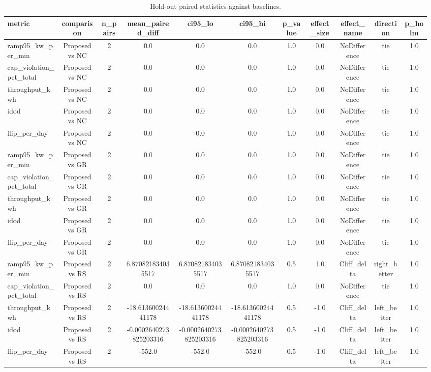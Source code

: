 \begin{table}[t]
\centering
\caption{Hold-out paired statistics against baselines.}
\label{tab:holdout_stats_auto}
\begin{tabular}{lcccccccccc}
\toprule
metric & comparison & n\_pairs & mean\_paired\_diff & ci95\_lo & ci95\_hi & p\_value & effect\_size & effect\_name & direction & p\_holm \\
\midrule
ramp95\_kw\_per\_min & Proposed vs NC & 2 & 0.0 & 0.0 & 0.0 & 1.0 & 0.0 & NoDifference & tie & 1.0 \\
cap\_violation\_pct\_total & Proposed vs NC & 2 & 0.0 & 0.0 & 0.0 & 1.0 & 0.0 & NoDifference & tie & 1.0 \\
throughput\_kwh & Proposed vs NC & 2 & 0.0 & 0.0 & 0.0 & 1.0 & 0.0 & NoDifference & tie & 1.0 \\
idod & Proposed vs NC & 2 & 0.0 & 0.0 & 0.0 & 1.0 & 0.0 & NoDifference & tie & 1.0 \\
flip\_per\_day & Proposed vs NC & 2 & 0.0 & 0.0 & 0.0 & 1.0 & 0.0 & NoDifference & tie & 1.0 \\
ramp95\_kw\_per\_min & Proposed vs GR & 2 & 0.0 & 0.0 & 0.0 & 1.0 & 0.0 & NoDifference & tie & 1.0 \\
cap\_violation\_pct\_total & Proposed vs GR & 2 & 0.0 & 0.0 & 0.0 & 1.0 & 0.0 & NoDifference & tie & 1.0 \\
throughput\_kwh & Proposed vs GR & 2 & 0.0 & 0.0 & 0.0 & 1.0 & 0.0 & NoDifference & tie & 1.0 \\
idod & Proposed vs GR & 2 & 0.0 & 0.0 & 0.0 & 1.0 & 0.0 & NoDifference & tie & 1.0 \\
flip\_per\_day & Proposed vs GR & 2 & 0.0 & 0.0 & 0.0 & 1.0 & 0.0 & NoDifference & tie & 1.0 \\
ramp95\_kw\_per\_min & Proposed vs RS & 2 & 6.870821834035517 & 6.870821834035517 & 6.870821834035517 & 0.5 & 1.0 & Cliff\_delta & right\_better & 1.0 \\
cap\_violation\_pct\_total & Proposed vs RS & 2 & 0.0 & 0.0 & 0.0 & 1.0 & 0.0 & NoDifference & tie & 1.0 \\
throughput\_kwh & Proposed vs RS & 2 & -18.61360024441178 & -18.61360024441178 & -18.61360024441178 & 0.5 & -1.0 & Cliff\_delta & left\_better & 1.0 \\
idod & Proposed vs RS & 2 & -0.0002640273825203316 & -0.0002640273825203316 & -0.0002640273825203316 & 0.5 & -1.0 & Cliff\_delta & left\_better & 1.0 \\
flip\_per\_day & Proposed vs RS & 2 & -552.0 & -552.0 & -552.0 & 0.5 & -1.0 & Cliff\_delta & left\_better & 1.0 \\

\end{tabular}
\end{table}
